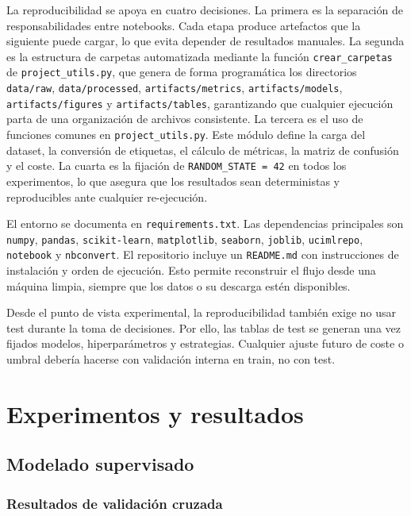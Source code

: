\documentclass[11pt,a4paper]{article}
\begin{document}
La reproducibilidad se apoya en cuatro decisiones. La primera es la separación de responsabilidades entre notebooks. Cada etapa produce artefactos que la siguiente puede cargar, lo que evita depender de resultados manuales. La segunda es la estructura de carpetas automatizada mediante la función \texttt{crear\_carpetas} de \texttt{project\_utils.py}, que genera de forma programática los directorios \texttt{data/raw}, \texttt{data/processed}, \texttt{artifacts/metrics}, \texttt{artifacts/models}, \texttt{artifacts/figures} y \texttt{artifacts/tables}, garantizando que cualquier ejecución parta de una organización de archivos consistente. La tercera es el uso de funciones comunes en \texttt{project\_utils.py}. Este módulo define la carga del dataset, la conversión de etiquetas, el cálculo de métricas, la matriz de confusión y el coste. La cuarta es la fijación de \texttt{RANDOM\_STATE = 42} en todos los experimentos, lo que asegura que los resultados sean deterministas y reproducibles ante cualquier re-ejecución.

El entorno se documenta en \texttt{requirements.txt}. Las dependencias principales son \texttt{numpy}, \texttt{pandas}, \texttt{scikit-learn}, \texttt{matplotlib}, \texttt{seaborn}, \texttt{joblib}, \texttt{ucimlrepo}, \texttt{notebook} y \texttt{nbconvert}. El repositorio incluye un \texttt{README.md} con instrucciones de instalación y orden de ejecución. Esto permite reconstruir el flujo desde una máquina limpia, siempre que los datos o su descarga estén disponibles.

Desde el punto de vista experimental, la reproducibilidad también exige no usar test durante la toma de decisiones. Por ello, las tablas de test se generan una vez fijados modelos, hiperparámetros y estrategias. Cualquier ajuste futuro de coste o umbral debería hacerse con validación interna en train, no con test.

\section{Experimentos y resultados}
\label{sec_experimentos}

\subsection{Modelado supervisado}
\label{sec_modelado}

\subsubsection{Resultados de validación cruzada}
\end{document}
